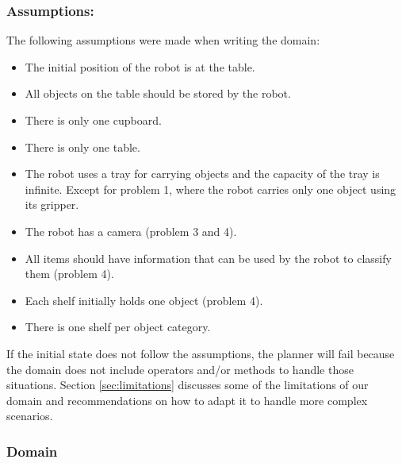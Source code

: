 \documentclass[paper=a4, fontsize=11pt]{scrartcl}
\begin{document}
	\subsubsection*{Assumptions:} \label{sec:assumptions}
	
	The following assumptions were made when writing the domain:
	
	\begin{itemize}
		\item The initial position of the robot is at the table.
		\item All objects on the table should be stored by the robot.
		\item There is only one cupboard.
		\item There is only one table.
		\item The robot uses a tray for carrying objects and the capacity of the tray is infinite. Except for problem 1, where the robot carries only one object using its gripper.
		\item The robot has a camera (problem 3 and 4).
		\item All items should have information that can be used by the robot to classify them (problem 4).		
		\item Each shelf initially holds one object (problem 4).
		\item There is one shelf per object category. 
	\end{itemize}
	
	If the initial state does not follow the assumptions, the planner will fail because the domain does not include operators and/or methods to handle those situations. Section \ref{sec:limitations} discusses some of the limitations of our domain and recommendations on how to adapt it to handle more complex scenarios.
	
	\subsubsection*{Domain}
	
\end{document}
